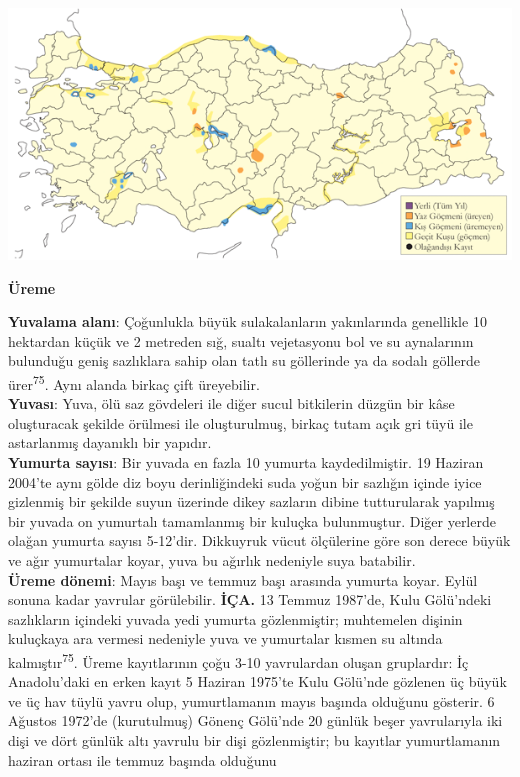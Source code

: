 \documentclass[
  letterpaper,
  DIV=11,
  numbers=noendperiod]{scrreprt}
\begin{document}
\includegraphics{images/harita_Page_035.png}

\textbf{Üreme}

\textbf{Yuvalama alanı}: Çoğunlukla büyük sulakalanların yakınlarında
genellikle 10 hektardan küçük ve 2 metreden sığ, sualtı vejetasyonu bol
ve su aynalarının bulunduğu geniş sazlıklara sahip olan tatlı su
göllerinde ya da sodalı göllerde ürer\textsuperscript{75}. Aynı alanda
birkaç çift üreyebilir.\\
\textbf{Yuvası}: Yuva, ölü saz gövdeleri ile diğer sucul bitkilerin
düzgün bir kâse oluşturacak şekilde örülmesi ile oluşturulmuş, birkaç
tutam açık gri tüyü ile astarlanmış dayanıklı bir yapıdır.\\
\textbf{Yumurta sayısı}: Bir yuvada en fazla 10 yumurta kaydedilmiştir.
19 Haziran 2004'te aynı gölde diz boyu derinliğindeki suda yoğun bir
sazlığın içinde iyice gizlenmiş bir şekilde suyun üzerinde dikey
sazların dibine tutturularak yapılmış bir yuvada on yumurtalı
tamamlanmış bir kuluçka bulunmuştur. Diğer yerlerde olağan yumurta
sayısı 5-12'dir. Dikkuyruk vücut ölçülerine göre son derece büyük ve
ağır yumurtalar koyar, yuva bu ağırlık nedeniyle suya batabilir.\\
\textbf{Üreme dönemi}: Mayıs başı ve temmuz başı arasında yumurta koyar.
Eylül sonuna kadar yavrular görülebilir. \textbf{İÇA.} 13 Temmuz
1987'de, Kulu Gölü'ndeki sazlıkların içindeki yuvada yedi yumurta
gözlenmiştir; muhtemelen dişinin kuluçkaya ara vermesi nedeniyle yuva ve
yumurtalar kısmen su altında kalmıştır\textsuperscript{75}. Üreme
kayıtlarının çoğu 3-10 yavrulardan oluşan gruplardır: İç Anadolu'daki en
erken kayıt 5 Haziran 1975'te Kulu Gölü'nde gözlenen üç büyük ve üç hav
tüylü yavru olup, yumurtlamanın mayıs başında olduğunu gösterir. 6
Ağustos 1972'de (kurutulmuş) Gönenç Gölü'nde 20 günlük beşer
yavrularıyla iki dişi ve dört günlük altı yavrulu bir dişi gözlenmiştir;
bu kayıtlar yumurtlamanın haziran ortası ile temmuz başında olduğunu
\end{document}
